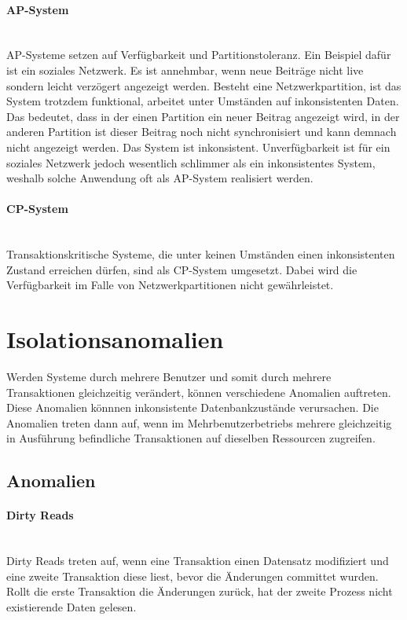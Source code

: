 \paragraph*{AP-System} \mbox{} \\
AP-Systeme setzen auf Verfügbarkeit und Partitionstoleranz. Ein Beispiel dafür ist ein soziales Netzwerk. Es ist annehmbar, wenn neue Beiträge nicht live sondern leicht verzögert angezeigt werden. Besteht eine Netzwerkpartition, ist das System trotzdem funktional, arbeitet unter Umständen auf inkonsistenten Daten. Das bedeutet, dass in der einen Partition ein neuer Beitrag angezeigt wird, in der anderen Partition ist dieser Beitrag noch nicht synchronisiert und kann demnach nicht angezeigt werden. Das System ist inkonsistent. Unverfügbarkeit ist für ein soziales Netzwerk jedoch wesentlich schlimmer als ein inkonsistentes System, weshalb solche Anwendung oft als AP-System realisiert werden.

\paragraph*{CP-System} \mbox{} \\
Transaktionskritische Systeme, die unter keinen Umständen einen inkonsistenten Zustand erreichen dürfen, sind als CP-System umgesetzt. Dabei wird die Verfügbarkeit im Falle von Netzwerkpartitionen nicht gewährleistet. 

\section{Isolationsanomalien}
Werden Systeme durch mehrere Benutzer und somit durch mehrere Transaktionen gleichzeitig verändert, können verschiedene Anomalien auftreten. Diese Anomalien könnnen inkonsistente Datenbankzustände verursachen. Die Anomalien treten dann auf, wenn im Mehrbenutzerbetriebs mehrere gleichzeitig in Ausführung befindliche Transaktionen auf dieselben Ressourcen zugreifen. 

\subsection{Anomalien} \label{subsec:isolationsanomalien}
\paragraph*{Dirty Reads} \mbox{} \\
Dirty Reads treten auf, wenn eine Transaktion einen Datensatz modifiziert und eine zweite Transaktion diese liest, bevor die Änderungen committet wurden. Rollt die erste Transaktion die Änderungen zurück, hat der zweite Prozess nicht existierende Daten gelesen\cite{IBMDocumentation.2021}.

